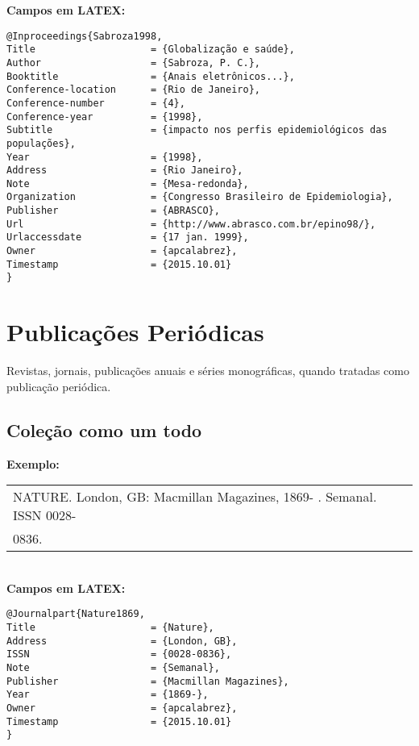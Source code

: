 \textbf{Campos em LATEX:} 

\begin{verbatim}
@Inproceedings{Sabroza1998,
Title                    = {Globalização e saúde},
Author                   = {Sabroza, P. C.},
Booktitle                = {Anais eletrônicos...},
Conference-location      = {Rio de Janeiro},
Conference-number        = {4},
Conference-year          = {1998},
Subtitle                 = {impacto nos perfis epidemiológicos das 
populações},
Year                     = {1998},
Address                  = {Rio Janeiro},
Note                     = {Mesa-redonda},
Organization             = {Congresso Brasileiro de Epidemiologia},
Publisher                = {ABRASCO},
Url                      = {http://www.abrasco.com.br/epino98/},
Urlaccessdate            = {17 jan. 1999},
Owner                    = {apcalabrez},
Timestamp                = {2015.10.01}
}
\end{verbatim}

\section{Publicações Periódicas}

Revistas, jornais, publicações anuais e séries monográficas, quando
tratadas como publicação periódica. \\

\subsection{Coleção como um todo}

\textbf{Exemplo:} \\

\begin{tabular}{|l|c|} \hline
NATURE. London, GB: Macmillan Magazines, 1869- . Semanal. ISSN
0028-\\0836.\\\hline
\end{tabular} \\

\textbf{Campos em LATEX:} 

\begin{verbatim}
@Journalpart{Nature1869,
Title                    = {Nature},
Address                  = {London, GB},
ISSN                     = {0028-0836},
Note                     = {Semanal},
Publisher                = {Macmillan Magazines},
Year                     = {1869-},
Owner                    = {apcalabrez},
Timestamp                = {2015.10.01}
}
\end{verbatim}


